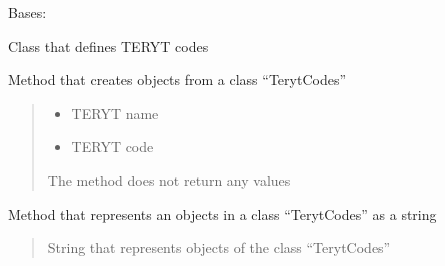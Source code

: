 \documentclass[letterpaper,10pt,english]{sphinxmanual}
\begin{document}
\begin{fulllineitems}
\label{\detokenize{db_classes:db_classes.TerytCodes}}
\pysigstartsignatures
{}
\pysigstopsignatures
\sphinxAtStartPar
Bases: 

\sphinxAtStartPar
Class that defines TERYT codes

\begin{fulllineitems}
\label{\detokenize{db_classes:db_classes.TerytCodes.__init__}}
\pysigstartsignatures
{}
\pysigstopsignatures
\sphinxAtStartPar
Method that creates objects from a class “TerytCodes”
\begin{quote}\begin{description}
\begin{itemize}
\item {} 
\sphinxAtStartPar
{} \textendash{} TERYT name

\item {} 
\sphinxAtStartPar
{} \textendash{} TERYT code

\end{itemize}

\sphinxAtStartPar
The method does not return any values

\end{description}\end{quote}

\end{fulllineitems}


\begin{fulllineitems}
\label{\detokenize{db_classes:db_classes.TerytCodes.__repr__}}
\pysigstartsignatures
{}
\pysigstopsignatures
\sphinxAtStartPar
Method that represents an objects in a class “TerytCodes” as a string
\begin{quote}\begin{description}
\sphinxAtStartPar
{}

\sphinxAtStartPar
String that represents objects of the class “TerytCodes”

\end{description}\end{quote}

\end{fulllineitems}


\end{fulllineitems}
\end{document}

